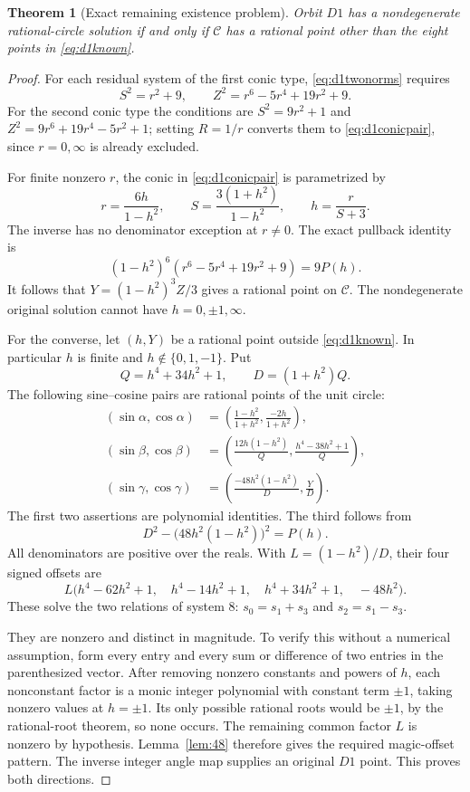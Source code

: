 \documentclass[11pt,letterpaper]{article}
\newtheorem{theorem}{Theorem}[section]
\theoremstyle{definition}\newtheorem{definition}[theorem]{Definition}
\theoremstyle{remark}\newtheorem{remark}[theorem]{Remark}
\begin{document}
\begin{theorem}[Exact remaining existence problem]\label{thm:d1equivalence}
Orbit $D1$ has a nondegenerate rational-circle solution if and only if $\mathcal C$ has a rational point other than the eight points in \eqref{eq:d1known}.
\end{theorem}
\begin{proof}
For each residual system of the first conic type, \eqref{eq:d1twonorms} requires
\begin{equation}\label{eq:d1conicpair}
 S^2=r^2+9,\qquad Z^2=r^6-5r^4+19r^2+9.
\end{equation}
For the second conic type the conditions are $S^2=9r^2+1$ and $Z^2=9r^6+19r^4-5r^2+1$; setting $R=1/r$ converts them to \eqref{eq:d1conicpair}, since $r=0,\infty$ is already excluded.

For finite nonzero $r$, the conic in \eqref{eq:d1conicpair} is parametrized by
\[
 r=\frac{6h}{1-h^2},\qquad S=\frac{3(1+h^2)}{1-h^2},\qquad
 h=\frac{r}{S+3}.
\]
The inverse has no denominator exception at $r\ne0$. The exact pullback identity is
\[
 (1-h^2)^6\left(r^6-5r^4+19r^2+9\right)=9P(h).
\]
It follows that $Y=(1-h^2)^3Z/3$ gives a rational point on $\mathcal C$. The nondegenerate original solution cannot have $h=0,\pm1,\infty$.

For the converse, let $(h,Y)$ be a rational point outside \eqref{eq:d1known}. In particular $h$ is finite and $h\notin\{0,1,-1\}$. Put
\[
 Q=h^4+34h^2+1,\qquad D=(1+h^2)Q.
\]
The following sine--cosine pairs are rational points of the unit circle:
\begin{align*}
 (\sin\alpha,\cos\alpha)&=\left(\frac{1-h^2}{1+h^2},\frac{-2h}{1+h^2}\right),\\
 (\sin\beta,\cos\beta)&=\left(\frac{12h(1-h^2)}{Q},\frac{h^4-38h^2+1}{Q}\right),\\
 (\sin\gamma,\cos\gamma)&=\left(\frac{-48h^2(1-h^2)}{D},\frac{Y}{D}\right).
\end{align*}
The first two assertions are polynomial identities. The third follows from
\[
 D^2-\bigl(48h^2(1-h^2)\bigr)^2=P(h).
\]
All denominators are positive over the reals. With $L=(1-h^2)/D$, their four signed offsets are
\begin{equation}\label{eq:d1reconstructed}
 L\bigl(h^4-62h^2+1,\quad h^4-14h^2+1,\quad h^4+34h^2+1,\quad-48h^2\bigr).
\end{equation}
These solve the two relations of system 8: $s_0=s_1+s_3$ and $s_2=s_1-s_3$.

They are nonzero and distinct in magnitude. To verify this without a numerical assumption, form every entry and every sum or difference of two entries in the parenthesized vector. After removing nonzero constants and powers of $h$, each nonconstant factor is a monic integer polynomial with constant term $\pm1$, taking nonzero values at $h=\pm1$. Its only possible rational roots would be $\pm1$, by the rational-root theorem, so none occurs. The remaining common factor $L$ is nonzero by hypothesis. Lemma~\ref{lem:48} therefore gives the required magic-offset pattern. The inverse integer angle map supplies an original $D1$ point. This proves both directions.
\end{proof}
\end{document}
